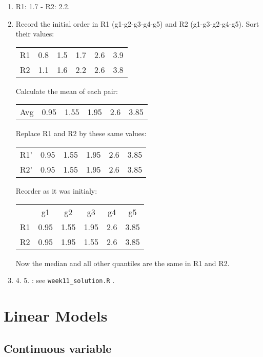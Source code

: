 \documentclass[a4paper,11pt]{article}
\begin{document}
\begin{enumerate}
\item R1: 1.7 - R2: 2.2.
\item Record the initial order in R1 (g1-g2-g3-g4-g5) and R2 (g1-g3-g2-g4-g5).
Sort their values:
\begin{tabular}{ cccccc }
R1 &    0.8   &    1.5   &   1.7    &    2.6   &   3.9    \\
R2 &    1.1   &    1.6   &   2.2    &    2.6   &   3.8    \\
\end{tabular}

Calculate the mean of each pair:

\begin{tabular}{ cccccc }
Avg &   0.95  &    1.55  &   1.95  &    2.6   &   3.85   \\
\end{tabular}

Replace R1 and R2 by these same values:

\begin{tabular}{ cccccc }
R1' &   0.95  &    1.55  &   1.95  &    2.6   &   3.85    \\
R2' &   0.95  &    1.55  &   1.95  &    2.6   &   3.85    \\
\end{tabular}

Reorder as it was initialy:

\begin{tabular}{ cccccc }
      &     g1   &    g2    &    g3    &    g4    &   g5 \\
R1 &   0.95  &    1.55  &   1.95  &    2.6   &   3.85    \\
R2 &   0.95  &    1.95  &   1.55  &    2.6   &   3.85    \\
\end{tabular}

Now the median and all other quantiles are the same in R1 and R2.
 
\item 4. 5. : see \texttt{week11\_solution.R} .
\end{enumerate}


\section{Linear Models}

\subsection{Continuous variable}
\end{document}
